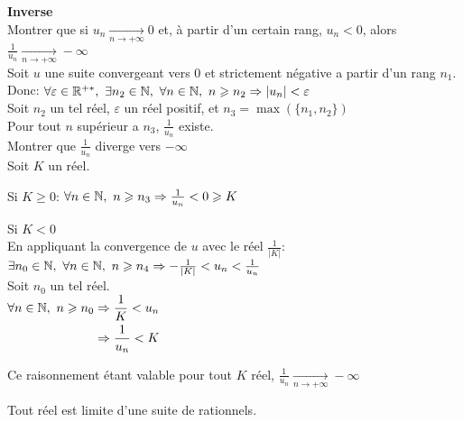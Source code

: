 \documentclass[12pt,twoside,a4paper]{article}
\begin{document}
		\begin{preuve}
			\textbf{Inverse}\\
			Montrer que si $u_n\mathop{\longrightarrow}\limits_{n\rightarrow+\infty}0$ et, \`a partir d'un certain rang, $u_n<0$, alors $\frac{1}{u_n}\mathop{\longrightarrow}\limits_{n\rightarrow+\infty}-\infty$\\
			Soit $u$ une suite convergeant vers $0$ et strictement négative a partir d'un rang $n_1$.\\
			Donc: $\forall\varepsilon\in\mathbb{R}^{+*},\ \exists n_2\in\mathbb{N},\ \forall n\in\mathbb{N},\ n\geqslant n_2\Rightarrow|u_n|<\varepsilon$\\
			Soit $n_2$ un tel réel, $\varepsilon$ un réel positif, et $n_3=\max(\{n_1,n_2\})$\\
			Pour tout $n$ supérieur a $n_3$, $\frac{1}{u_n}$ existe.\\
			Montrer que $\frac{1}{u_n}$ diverge vers $-\infty$\\
			Soit $K$ un réel.
			\begin{liste}
				\item Si $K\geqslant0$: $\forall n\in\mathbb{N},\ n\geqslant n_3\Rightarrow \frac1{u_n}<0\geqslant K$
				\item Si $K<0$\\
					En appliquant la convergence de $u$ avec le réel $\frac1{|K|}$:\\
					$\exists n_0\in\N,\ \forall n\in\N,\ n\geqslant n_4\Rightarrow -\frac1{|K|}<u_n<\frac1{u_n}$\\
					Soit $n_0$ un tel réel.\\
					$\begin{aligned}
						\forall n\in\mathbb{N},\ n\geqslant n_0&\Rightarrow \frac1{K}<u_n\\
							&\Rightarrow \frac{1}{u_n}<K
					\end{aligned}$
			\end{liste}
			Ce raisonnement étant valable pour tout $K$ réel, $\frac1{u_n}\mathop{\longrightarrow}\limits_{n\rightarrow+\infty}-\infty$
		\end{preuve}
		\begin{prop}
			Tout réel est limite d'une suite de rationnels.
		\end{prop}
\end{document}
